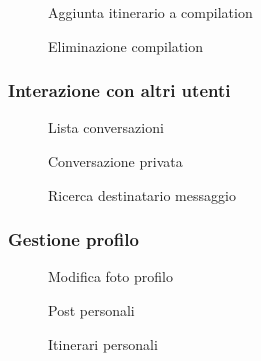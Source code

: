 \documentclass{natourDoc}
\begin{document}
\begin{figure}[!htbp]
	\centering
	
	\caption{Aggiunta itinerario a compilation}
\end{figure}
\FloatBarrier

\begin{figure}[!htbp]
	\centering
	
	\caption{Eliminazione compilation}
\end{figure}
\FloatBarrier

\newpage
\subsubsection{Interazione con altri utenti}
\begin{figure}[!htbp]
	\centering
	
	\caption{Lista conversazioni}
\end{figure}
\FloatBarrier

\begin{figure}[!htbp]
	\centering
	
	\caption{Conversazione privata}
\end{figure}
\FloatBarrier

\begin{figure}[!htbp]
	\centering
	
	\caption{Ricerca destinatario messaggio}
\end{figure}
\FloatBarrier

\newpage

\subsubsection{Gestione profilo}
\begin{figure}[!htbp]
	\centering
	
	\caption{Modifica foto profilo}
\end{figure}
\FloatBarrier

\begin{figure}[!htbp]
	\centering
	
	\caption{Post personali}
\end{figure}
\FloatBarrier

\begin{figure}[!htbp]
	\centering
	
	\caption{Itinerari personali}
\end{figure}
\FloatBarrier
\end{document}
